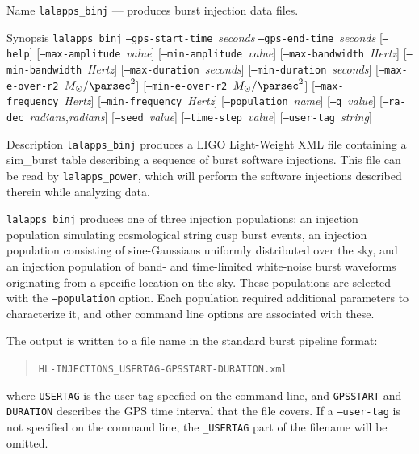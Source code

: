 \documentclass[10pt]{article}
\newcommand{\prog}[1]{\texttt{#1}}
\newcommand{\option}[1]{\texttt{#1}}
\newcommand{\parm}[1]{\textit{#1}}
\newenvironment{entry}%
{\begin{list}{}{\renewcommand{\makelabel}[1]%
{\parbox[b]{\labelwidth}{\makebox[0pt][l]{\textbf{##1}}\\}}%
\setlength{\labelwidth}{1em}%
\setlength{\labelsep}{1em}%
\setlength{\leftmargin}{2em}%
\setlength{\topsep}{\medskipamount}%
\setlength{\itemsep}{\medskipamount}%
\setlength{\parsep}{\medskipamount}%
\setlength{\listparindent}{0pt}}}
{\end{list}}
\begin{document}
\begin{entry}
\item[Name]
\prog{lalapps\_binj} --- produces burst injection data files.

\item[Synopsis]
\prog{lalapps\_binj}
\option{--gps-start-time}~\parm{seconds}
\option{--gps-end-time}~\parm{seconds}
[\option{--help}]
[\option{--max-amplitude}~\parm{value}]
[\option{--min-amplitude}~\parm{value}]
[\option{--max-bandwidth}~\parm{Hertz}]
[\option{--min-bandwidth}~\parm{Hertz}]
[\option{--max-duration}~\parm{seconds}]
[\option{--min-duration}~\parm{seconds}]
[\option{--max-e-over-r2}~\parm{\(\Msol/\text{\parsec}^{2}\)}]
[\option{--min-e-over-r2}~\parm{\(\Msol/\text{\parsec}^{2}\)}]
[\option{--max-frequency}~\parm{Hertz}]
[\option{--min-frequency}~\parm{Hertz}]
[\option{--population}~\parm{name}]
[\option{--q}~\parm{value}]
[\option{--ra-dec}~\parm{radians},\parm{radians}]
[\option{--seed}~\parm{value}]
[\option{--time-step}~\parm{value}]
[\option{--user-tag}~\parm{string}]

\item[Description] 
\prog{lalapps\_binj} produces a LIGO Light-Weight XML file containing a
sim\_burst table describing a sequence of burst software injections.  This
file can be read by \prog{lalapps\_power}, which will perform the software
injections described therein while analyzing data.

\prog{lalapps\_binj} produces one of three injection populations:  an
injection population simulating cosmological string cusp burst events, an
injection population consisting of sine-Gaussians uniformly distributed
over the sky, and an injection population of band- and time-limited
white-noise burst waveforms originating from a specific location on the
sky.  These populations are selected with the \option{--population} option.
Each population required additional parameters to characterize it, and
other command line options are associated with these.

The output is written to a file name in the standard burst pipeline format:
\begin{quote}
\texttt{HL-INJECTIONS\_USERTAG-GPSSTART-DURATION.xml}
\end{quote}
where \texttt{USERTAG} is the user tag specfied on the command line, and
\texttt{GPSSTART} and \texttt{DURATION} describes the GPS time interval
that the file covers.  If a \option{--user-tag} is not specified on the
command line, the \texttt{\_USERTAG} part of the filename will be omitted.


\end{entry}
\end{document}
